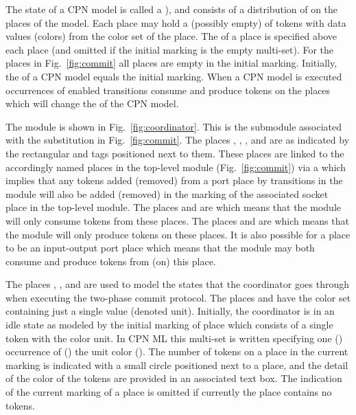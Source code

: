 
The state of a CPN model is called a ), and consists
of a distribution of  on the places of the model. Each
place may hold a (possibly empty)  of tokens with
data values (colors) from the color set of the place. The
 of a place is specified above each place
(and omitted if the initial marking is the empty multi-set). For the
places in Fig.~\ref{fig:commit} all places are empty in the initial
marking. Initially, the  of a CPN model
equals the initial marking. When a CPN model is executed occurrences of
enabled transitions consume and produce tokens on the places which
will change the  of the CPN model.

 

The  module is shown in
Fig.~\ref{fig:coordinator}. This is the submodule associated with the
 substitution in Fig.~\ref{fig:commit}. The
places , , , and
 are  as indicated by the
rectangular  and  tags positioned next to
them. These places are linked to the accordingly named places in the
top-level module (Fig.~\ref{fig:commit}) via a  which implies that any tokens added (removed) from a
port place by transitions in the  module will
also be added (removed) in the marking of the associated socket place
in the top-level module. The places  and
 are  which means that
the module will only consume tokens from these places.  The places
 and  are  which means that the  module will only
produce tokens on these places. It is also possible for a place to be
an input-output port place which means that the module may both
consume and produce tokens from (on) this place.

The places , , and
 are used to model the states that the
coordinator goes through when executing the two-phase commit
protocol. The places  and  have
the color set  containing just a single value
\smlcode{()} (denoted unit). Initially, the coordinator is in an idle
state as modeled by the initial marking of place  which
consists of a single token with the color unit. In CPN ML this
multi-set is written  specifying one ()
occurrence of () the unit color (\smlcode{()}).  The number
of tokens on a place in the current marking is indicated with a small
circle positioned next to a place, and the detail of the color of the
tokens are provided in an associated text box. The indication of the
current marking of a place is omitted if currently the place contains
no tokens.

